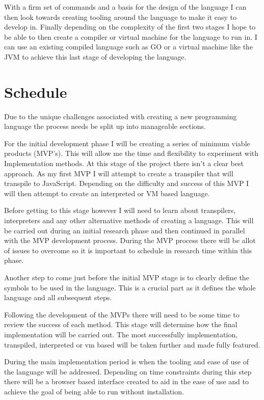 \documentclass[12pt]{article}
\begin{document}
With a firm set of commands and a basis for the design of the language I can then look towards creating tooling around the language to make it easy to develop in. Finally depending on
the complexity of the first two stages I hope to be able to then create a compiler or virtual machine for the language to run in. I can use an existing compiled language such as GO or a virtual machine like the JVM
to achieve this last stage of developing the language.


\section{Schedule}

Due to the unique challenges associated with creating a new programming language the process needs be split up into manageable sections.

For the initial development phase I will be creating a series of minimum viable products (MVP's). This will allow me the time and flexibility to 
experiment with Implementation methods. At this stage of the project there isn't a clear best approach. As my first MVP I will attempt to create
a transpiler that will transpile to JavaScript. Depending on the difficulty and success of this MVP I will then attempt to create an interpreted or VM based language.

Before getting to this stage however I will need to learn about transpilers, interpreters and any other alternative methods of creating a language. This will be carried out
during an initial research phase and then continued in parallel with the MVP development process.
During the MVP process there will be allot of issues to overcome so it is important to schedule in research time within this phase.

Another step to come just before the initial MVP stage is to clearly define the symbols to be used in the language. This is a crucial
part as it defines the whole language and all subsequent steps.

Following the development of the MVPs there will need to be some time to review the success of each method.
This stage will determine how the final implementation will be carried out. The most successfully implementation, transpiled, interpreted or vm based will be taken further and made fully featured.

During the main implementation period is when the tooling and ease of use of the language will be addressed.
Depending on time constraints during this step there will be a browser based interface created to aid in the ease of use and to achieve the goal of being able to run without installation.
\end{document}
